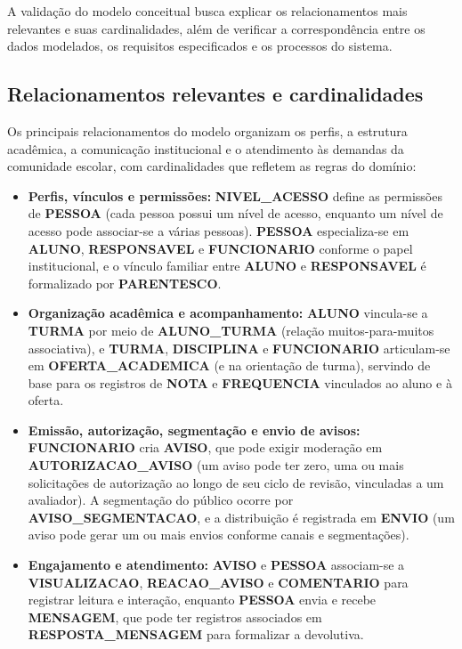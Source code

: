 \documentclass[a4paper,12pt]{report}
\begin{document}
A validação do modelo conceitual busca explicar os relacionamentos mais relevantes e suas cardinalidades, além de verificar a correspondência entre os dados modelados, os requisitos especificados e os processos do sistema.

\subsection{Relacionamentos relevantes e cardinalidades}

Os principais relacionamentos do modelo organizam os perfis, a estrutura acadêmica, a comunicação institucional e o atendimento às demandas da comunidade escolar, com cardinalidades que refletem as regras do domínio:

\begin{itemize}
    \item \textbf{Perfis, vínculos e permissões:} \textbf{NIVEL\_ACESSO} define as permissões de \textbf{PESSOA} (cada pessoa possui um nível de acesso, enquanto um nível de acesso pode associar-se a várias pessoas). \textbf{PESSOA} especializa-se em \textbf{ALUNO}, \textbf{RESPONSAVEL} e \textbf{FUNCIONARIO} conforme o papel institucional, e o vínculo familiar entre \textbf{ALUNO} e \textbf{RESPONSAVEL} é formalizado por \textbf{PARENTESCO}.
    \item \textbf{Organização acadêmica e acompanhamento:} \textbf{ALUNO} vincula-se a \textbf{TURMA} por meio de \textbf{ALUNO\_TURMA} (relação muitos-para-muitos associativa), e \textbf{TURMA}, \textbf{DISCIPLINA} e \textbf{FUNCIONARIO} articulam-se em \textbf{OFERTA\_ACADEMICA} (e na orientação de turma), servindo de base para os registros de \textbf{NOTA} e \textbf{FREQUENCIA} vinculados ao aluno e à oferta.
    \item \textbf{Emissão, autorização, segmentação e envio de avisos:} \textbf{FUNCIONARIO} cria \textbf{AVISO}, que pode exigir moderação em \textbf{AUTORIZACAO\_AVISO} (um aviso pode ter zero, uma ou mais solicitações de autorização ao longo de seu ciclo de revisão, vinculadas a um avaliador). A segmentação do público ocorre por \textbf{AVISO\_SEGMENTACAO}, e a distribuição é registrada em \textbf{ENVIO} (um aviso pode gerar um ou mais envios conforme canais e segmentações).
    \item \textbf{Engajamento e atendimento:} \textbf{AVISO} e \textbf{PESSOA} associam-se a \textbf{VISUALIZACAO}, \textbf{REACAO\_AVISO} e \textbf{COMENTARIO} para registrar leitura e interação, enquanto \textbf{PESSOA} envia e recebe \textbf{MENSAGEM}, que pode ter registros associados em \textbf{RESPOSTA\_MENSAGEM} para formalizar a devolutiva.
\end{itemize}
\end{document}
